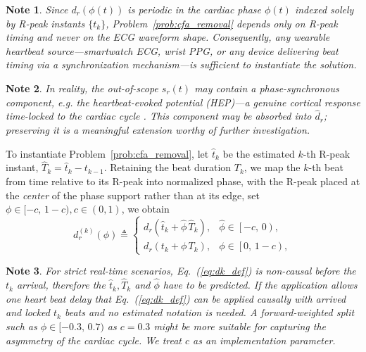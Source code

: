 \documentclass[conference]{IEEEtran}
\newtheorem{noteenv}{Note}
\begin{document}
\begin{noteenv}\label{note:timing_only}
Since $d_r(\phi(t))$ is periodic in the cardiac phase $\phi(t)$ indexed solely by R-peak instants
$\{t_k\}$, Problem~\ref{prob:cfa_removal} depends only on R-peak \emph{timing} and never on the
ECG waveform shape. Consequently, any wearable heartbeat source---smartwatch ECG, wrist
PPG, or any device delivering beat timing via a synchronization mechanism---is sufficient to
instantiate the solution.
\end{noteenv}

\begin{noteenv}\label{note:hep}
In reality, the out-of-scope $s_r(t)$ may contain a phase-synchronous component, e.g. the
heartbeat-evoked potential (HEP)---a genuine cortical response time-locked to the cardiac cycle
\cite{park2019}. This component may be absorbed into $\hat{d}_r$; preserving it is a meaningful
extension worthy of further investigation.
\end{noteenv}



To instantiate Problem~\ref{prob:cfa_removal}, let $\hat{t}_k$ be
the estimated $k$-th R-peak instant, $\hat{T}_k = \hat{t}_{k} - t_{k-1}$. Retaining the beat duration
$T_k$, we map the $k$-th beat from time relative to its R-peak into normalized
phase, with the R-peak placed at the \emph{center} of the phase support rather than at its edge, set 
$\phi\in[-c,\,1-c), c \in (0, 1)$, we obtain
\begin{equation}
d_r^{(k)}(\phi) \triangleq
\begin{cases}
d_r\!\left(\hat{t}_k + \hat{\phi}\,\hat{T}_k\right), & \hat{\phi}\in\left[-c,\,0\right),\\[3pt]
d_r\!\left(t_k + \phi\,T_k\right),   & \phi\in\left[0,\,1 - c\right),
\end{cases}
\label{eq:dk_def}
\end{equation}

\begin{noteenv}\label{note:phase_origin}
For strict real-time scenarios, Eq.~(\ref{eq:dk_def}) is non-causal before the $t_k$ arrival, therefore the 
$\hat{t}_k, \hat{T}_k$ and $\hat{\phi}$ have to be predicted. If the application allows one heart beat delay that 
Eq.~(\ref{eq:dk_def}) can be applied causally with arrived and locked $t_k$ beats and no estimated notation is needed.
A forward-weighted split such as $\phi\in[-0.3,\,0.7)$ as $c=0.3$ might be more suitable for capturing the asymmetry of the cardiac cycle.
We treat $c$ as an implementation parameter. 
\end{noteenv}
\end{document}
